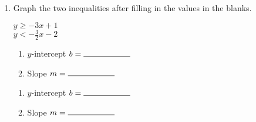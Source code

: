 \documentclass[12pt, twoside]{article}
\begin{document}
\begin{enumerate}
\begin{multicols}{2}
          Line: \hspace{1cm} Solid ($=$) \hspace{0.45cm} Dashed ($\neq$)\\[0.5cm]
          Shading: \hspace{0.3cm} Above ($y>$) \hspace{0.25cm} Below ($y<$)
        \end{multicols}

    \newpage
    \item Graph the two inequalities after filling in the values in the blanks.\\[0.5cm]

      \begin{multicols}{2}
        $y \geq -3 x +1$ \\
        $y < -\frac{3}{2} x -2$
      \end{multicols}
      \begin{multicols}{2}
        \raggedcolumns
        \begin{enumerate}
          \item $y$-intercept $b= \rule{2cm}{0.15mm}$ \\[0.5cm]
          \item Slope \hspace{0.7cm} $m= \rule{2cm}{0.15mm}$\\[0.5cm]
        \end{enumerate}
        \begin{enumerate}
          \item $y$-intercept $b= \rule{2cm}{0.15mm}$ \\[0.5cm]
          \item Slope \hspace{0.7cm} $m= \rule{2cm}{0.15mm}$\\[0.5cm]
        \end{enumerate}
      \end{multicols}

      \begin{center} %
      \end{center}

\newpage


\end{enumerate}
\end{document}
